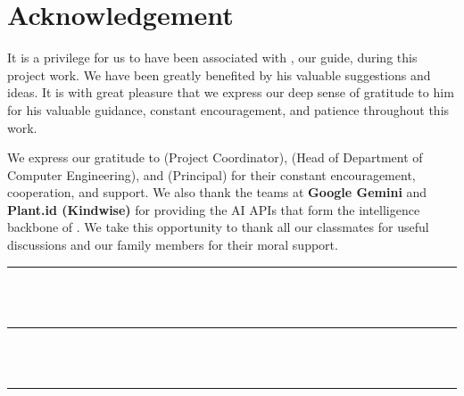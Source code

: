 \chapter*{Acknowledgement}

It is a privilege for us to have been associated with \textbf{\Supervisor}, our
guide, during this project work. We have been greatly benefited by his valuable
suggestions and ideas. It is with great pleasure that we express our deep sense of
gratitude to him for his valuable guidance, constant encouragement, and patience
throughout this work.

We express our gratitude to \textbf{\ProjectCoordinator} (Project Coordinator),
\textbf{\HOD} (Head of Department of Computer Engineering), and
\textbf{\Principal} (Principal) for their constant encouragement, cooperation,
and support. We also thank the teams at \textbf{Google Gemini} and \textbf{Plant.id
(Kindwise)} for providing the AI APIs that form the intelligence backbone of \ProjectShortName.
We take this opportunity to thank all our classmates for useful discussions and our family
members for their moral support.

\vspace{1cm}
\begin{flushright}
    \rule{6cm}{0.5pt} \\[-0.4cm]
    \makebox[6cm]{\StudentOne} \\[1cm]
    \rule{6cm}{0.5pt} \\[-0.4cm]
    \makebox[6cm]{\StudentTwo} \\[1cm]
    \rule{6cm}{0.5pt} \\[-0.4cm]
    \makebox[6cm]{\StudentThree} \\
\end{flushright}
